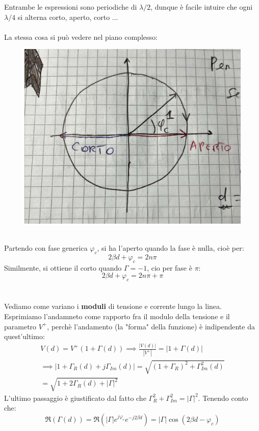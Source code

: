 \documentclass{book}
\begin{document}
    Entrambe le espressioni sono periodiche di $\lambda/2$, dunque è facile intuire che ogni $\lambda/4$ si alterna corto, aperto, corto ... \\ \\
    La stessa cosa si può vedere nel piano complesso:
    \begin{figure}[h!]
        \center  
        \includegraphics[width=0.5\linewidth]{Chapter_two/Chapt2img13.png}
    \end{figure}
    \\ Partendo con fase generica $\varphi_{c}$, si ha l'aperto quando la fase è nulla, cioè per:
    \begin{equation}
        \label{eqn:max_tensione}
        2 \beta d + \varphi_{c} = 2n \pi
    \end{equation}
    Similmente, si ottiene il corto quando $\Gamma=-1$, cio per fase è $\pi$:
    \begin{equation}
        \label{eqn:max_corrente}
        2\beta d + \varphi_{c}=2 n \pi + \pi
    \end{equation}
    \\ \\ 
    Vediamo come variano i \textbf{moduli} di tensione e corrente lungo la linea. Esprimiamo l'andamneto come rapporto fra il modulo
    della tensione e il parametro $V^{+}$, perchè l'andamento  (la "forma" della funzione) è indipendente da quest'ultimo:
    \begin{align}
        V(d) = V^{+}(1+\Gamma (d)) \implies \frac{|V(d)|}{|V^{+}|} = |1+\Gamma (d)| \\
        \implies |1+\Gamma_{R}(d)+j \Gamma_{Im}(d)| = \sqrt{(1+\Gamma_{R})^{2}+\Gamma_{Im}^{2}(d)} \\
        = \sqrt{1 + 2 \Gamma_{R}(d)+|\Gamma|^{2}}
    \end{align}
    L'ultimo passaggio è giustificato dal fatto che $\Gamma_{R}^{2}+\Gamma_{Im} ^{2} = |\Gamma|^{2}$. Tenendo conto che:
    \begin{equation}
        \Re(\Gamma (d)) = \Re(|\Gamma|e^{j \varphi_{c}}e^{-j 2 \beta d}) = |\Gamma|\cos(2\beta d - \varphi_{c})
    \end{equation}
\end{document}
